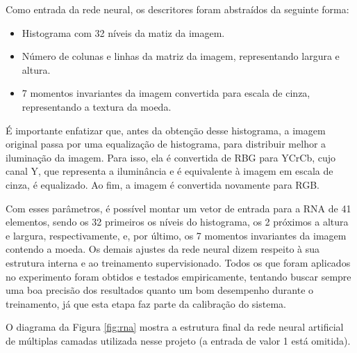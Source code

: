 \documentclass[10pt,journal]{IEEEtran}
\begin{document}
Como entrada da rede neural, os descritores foram abstraídos da seguinte forma:

\begin{itemize}  
\item Histograma com 32 níveis da matiz da imagem.
\item Número de colunas e linhas da matriz da imagem, representando largura e altura.
\item 7 momentos invariantes da imagem convertida para escala de cinza, representando a textura da moeda.
\end{itemize}

É importante enfatizar que, antes da obtenção desse histograma, a imagem original passa por uma equalização de histograma, para distribuir melhor a iluminação da imagem. Para isso, ela é convertida de RBG para YCrCb, cujo canal Y, que representa a iluminância e é equivalente à imagem em escala de cinza, é equalizado. Ao fim, a imagem é convertida novamente para RGB. 

Com esses parâmetros, é possível montar um vetor de entrada para a RNA  de 41 elementos, sendo os 32 primeiros os níveis do histograma, os 2 próximos a altura e largura, respectivamente, e, por último, os 7 momentos invariantes da imagem contendo a moeda. Os demais ajustes da rede neural dizem respeito à sua estrutura interna e ao treinamento supervisionado. Todos os que foram aplicados no experimento foram obtidos e testados empiricamente, tentando buscar sempre uma boa precisão dos resultados quanto um bom desempenho durante o treinamento, já que esta etapa faz parte da calibração do sistema.

O diagrama da Figura \ref{fig:rna} mostra a estrutura final da rede neural artificial de múltiplas camadas utilizada nesse projeto (a entrada de valor 1 está omitida).

\end{document}
